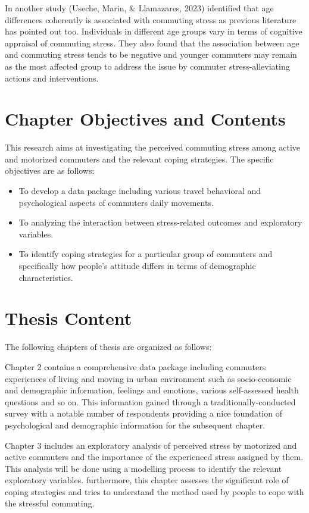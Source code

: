 \documentclass[
11pt, %
oneside, %
english, %
singlespacing, %
]{macthesis} %
\begin{document}
In another study (Useche, Marin, \& Llamazares, 2023) identified that age differences coherently is associated with commuting stress as previous literature has pointed out too. Individuals in different age groups vary in terms of cognitive appraisal of commuting stress. They also found that the association between age and commuting stress tends to be negative and younger commuters may remain as the most affected group to address the issue by commuter stress-alleviating actions and interventions.

\hypertarget{chapter-objectives-and-contents}{%
\section{Chapter Objectives and Contents}\label{chapter-objectives-and-contents}}

This research aims at investigating the perceived commuting stress among active and motorized commuters and the relevant coping strategies. The specific objectives are as follows:
\begin{itemize}
\item
  To develop a data package including various travel behavioral and psychological aspects of commuters daily movements.
\item
  To analyzing the interaction between stress-related outcomes and exploratory variables.
\item
  To identify coping strategies for a particular group of commuters and specifically how people's attitude differs in terms of demographic characteristics.
\end{itemize}
\hypertarget{thesis-content}{%
\section{Thesis Content}\label{thesis-content}}

The following chapters of thesis are organized as follows:

Chapter 2 contains a comprehensive data package including commuters experiences of living and moving in urban environment such as socio-economic and demographic information, feelings and emotions, various self-assessed health questions and so on. This information gained through a traditionally-conducted survey with a notable number of respondents providing a nice foundation of psychological and demographic information for the subsequent chapter.

Chapter 3 includes an exploratory analysis of perceived stress by motorized and active commuters and the importance of the experienced stress assigned by them. This analysis will be done using a modelling process to identify the relevant exploratory variables. furthermore, this chapter assesses the significant role of coping strategies and tries to understand the method used by people to cope with the stressful commuting.
\end{document}
